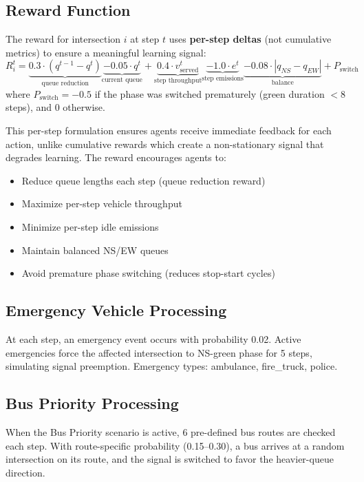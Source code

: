 \documentclass[12pt, a4paper]{article}
\begin{document}
\subsection{Reward Function}

The reward for intersection $i$ at step $t$ uses \textbf{per-step deltas} (not cumulative metrics) to ensure a meaningful learning signal:
\begin{equation}
    R_i^t = \underbrace{0.3 \cdot (q^{t-1} - q^t)}_{\text{queue reduction}} \underbrace{- 0.05 \cdot q^t}_{\text{current queue}} + \underbrace{0.4 \cdot v_{\text{served}}^t}_{\text{step throughput}} \underbrace{- 1.0 \cdot e^t}_{\text{step emissions}} \underbrace{- 0.08 \cdot |q_{NS} - q_{EW}|}_{\text{balance}} + P_{\text{switch}}
\end{equation}
where $P_{\text{switch}} = -0.5$ if the phase was switched prematurely (green duration $< 8$ steps), and 0 otherwise.

This per-step formulation ensures agents receive immediate feedback for each action, unlike cumulative rewards which create a non-stationary signal that degrades learning. The reward encourages agents to:
\begin{itemize}[nosep]
    \item Reduce queue lengths each step (queue reduction reward)
    \item Maximize per-step vehicle throughput
    \item Minimize per-step idle emissions
    \item Maintain balanced NS/EW queues
    \item Avoid premature phase switching (reduces stop-start cycles)
\end{itemize}

\subsection{Emergency Vehicle Processing}

At each step, an emergency event occurs with probability 0.02. Active emergencies force the affected intersection to NS-green phase for 5 steps, simulating signal preemption. Emergency types: ambulance, fire\_truck, police.

\subsection{Bus Priority Processing}

When the Bus Priority scenario is active, 6 pre-defined bus routes are checked each step. With route-specific probability (0.15--0.30), a bus arrives at a random intersection on its route, and the signal is switched to favor the heavier-queue direction.
\end{document}
